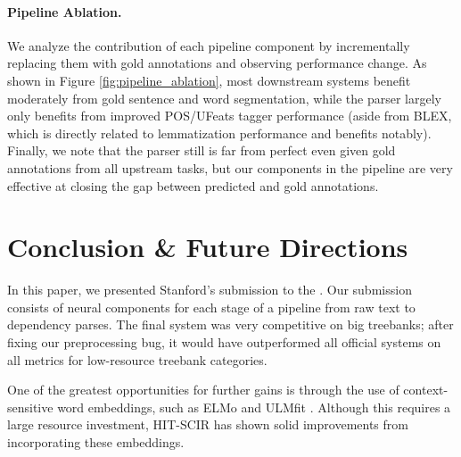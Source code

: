 \documentclass[11pt,a4paper]{article}
\begin{document}
\paragraph{Pipeline Ablation.} We analyze the contribution of each pipeline component by incrementally replacing them with gold annotations and observing  performance change.
As shown in Figure \ref{fig:pipeline_ablation}, most downstream systems benefit moderately from gold sentence and word segmentation, while the parser largely only benefits from improved POS/UFeats tagger performance (aside from BLEX, which is directly related to lemmatization performance and benefits notably).
Finally, we note that the parser still is far from perfect even given gold annotations from all upstream tasks, but our components in the pipeline are very effective at closing the gap between predicted and gold annotations.





%
 
\section{Conclusion \& Future Directions}

In this paper, we presented Stanford's submission to the \udst. Our submission consists of neural components for each stage of a pipeline from raw text to dependency parses. The final system was very competitive on big treebanks; after fixing our preprocessing bug, it would have outperformed all official systems on all metrics for low-resource treebank categories.

One of the greatest opportunities for further gains is through the use of context-sensitive word embeddings, such as ELMo \cite{peters2018deep} and ULMfit \cite{howard2018universal}.
Although this requires a large resource investment, HIT-SCIR \cite{che18towards} has shown solid improvements from incorporating these embeddings.
 


\end{document}
